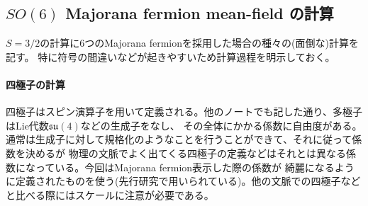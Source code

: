 \documentclass[11pt, aps, longbibliography]{article}
\begin{document}
    \subsection{$SO(6)$ Majorana fermion mean-field の計算}\label{sec:app2}\hypertarget{app_Majorana-mf}{}
        $S=3/2$の計算に6つのMajorana fermionを採用した場合の種々の(面倒な)計算を記す。
        特に符号の間違いなどが起きやすいため計算過程を明示しておく。
        \paragraph{四極子の計算}
        四極子はスピン演算子を用いて定義される。他のノートでも記した通り、多極子はLie代数$\mathfrak{su}(4)$などの生成子をなし、
        その全体にかかる係数に自由度がある。通常は生成子に対して規格化のようなことを行うことができて、それに従って係数を決めるが
        物理の文脈でよく出てくる四極子の定義などはそれとは異なる係数になっている。今回はMajorana fermion表示した際の係数が
        綺麗になるように定義されたものを使う(先行研究\cite{PhysRevB.102.075110}で用いられている)。他の文脈での四極子などと比べる際にはスケールに注意が必要である。
\end{document}
